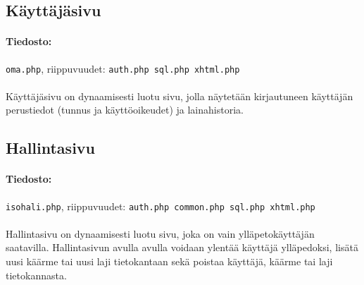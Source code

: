 \documentclass[11pt]{article}
\begin{document}
\subsection{Käyttäjäsivu}

\paragraph{Tiedosto:} \large{\texttt{oma.php}}, riippuvuudet: \texttt{auth.php sql.php xhtml.php}

\paragraph{} Käyttäjäsivu on dynaamisesti luotu sivu, jolla näytetään kirjautuneen käyttäjän perustiedot (tunnus ja käyttöoikeudet) ja lainahistoria.


\subsection{Hallintasivu}

\paragraph{Tiedosto:} \large{\texttt{isohali.php}}, riippuvuudet: \texttt{auth.php common.php sql.php xhtml.php}

\paragraph{} Hallintasivu on dynaamisesti luotu sivu, joka on vain ylläpetokäyttäjän saatavilla. Hallintasivun avulla avulla voidaan ylentää käyttäjä ylläpedoksi, lisätä uusi käärme tai uusi laji tietokantaan sekä poistaa käyttäjä, käärme tai laji tietokannasta.
\end{document}

